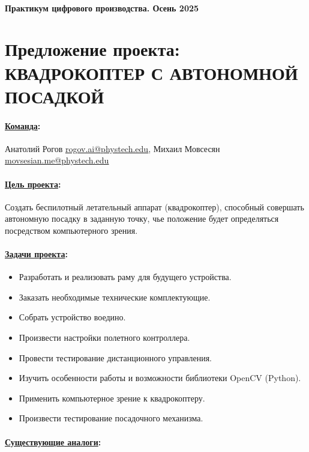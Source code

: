 \documentclass[a4paper,12pt]{article} %
\begin{document}
\paragraph{Практикум цифрового производства. Осень 2025}
\section*{Предложение проекта: \newline КВАДРОКОПТЕР С АВТОНОМНОЙ ПОСАДКОЙ}

\paragraph{\underline{Команда}:}
Анатолий Рогов \href{mailto:rogov.ai@phystech.edu}{\underline{rogov.ai@phystech.edu}}, Михаил Мовсесян \href{mailto:movsesian.me@phystech.edu}{\underline{movsesian.me@phystech.edu}}

\paragraph{\underline{Цель проекта}:}
Создать беспилотный летательный аппарат (квадрокоптер), способный совершать автономную посадку в заданную точку, чье положение будет определяться посредством компьютерного зрения.

\paragraph{\underline{Задачи проекта}:}
\begin{itemize}
    \item Разработать и реализовать раму для будущего устройства.
    \item Заказать необходимые технические комплектующие.
    \item Собрать устройство воедино.
    \item Произвести настройки полетного контроллера.
    \item Провести тестирование дистанционного управления.
    \item Изучить особенности работы и возможности библиотеки OpenCV (Python).
    \item Применить компьютерное зрение к квадрокоптеру.
    \item Произвести тестирование посадочного механизма.
\end{itemize}

\paragraph{\underline{Существующие аналоги}:}
\end{document}
